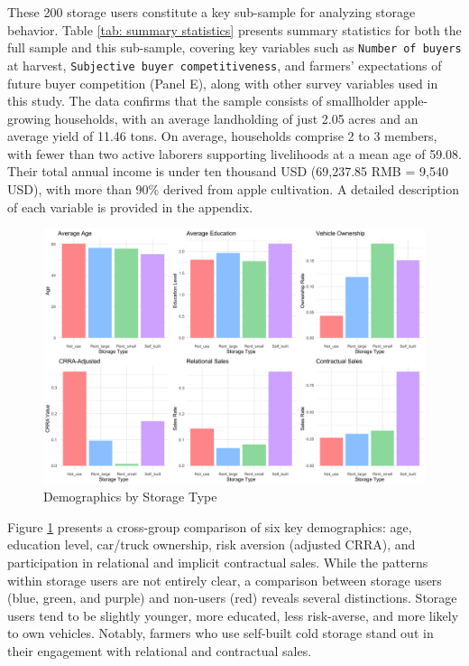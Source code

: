\documentclass[12pt]{article}
\begin{document}
These 200 storage users constitute a key sub-sample for analyzing storage behavior. Table \ref{tab: summary statistics} presents summary statistics for both the full sample and this sub-sample, covering key variables such as \texttt{Number of buyers} at harvest, \texttt{Subjective buyer competitiveness}, and farmers' expectations of future buyer competition (Panel E), along with other survey variables used in this study. The data confirms that the sample consists of smallholder apple-growing households, with an average landholding of just 2.05 acres and an average yield of 11.46 tons. On average, households comprise 2 to 3 members, with fewer than two active laborers supporting livelihoods at a mean age of 59.08. Their total annual income is under ten thousand USD (69,237.85 RMB = 9,540 USD), with more than 90\% derived from apple cultivation. A detailed description of each variable is provided in the appendix.

\begin{figure}[htp]
\centering
\includegraphics[width=1\textwidth]{figures/combined_storage_metrics.png}
\caption{Demographics by Storage Type}
\label{Figure: Demographics by Storage Type}
\end{figure}

Figure \ref{Figure: Demographics by Storage Type} presents a cross-group comparison of six key demographics: age, education level, car/truck ownership, risk aversion (adjusted CRRA), and participation in relational and implicit contractual sales. While the patterns within storage users are not entirely clear, a comparison between storage users (blue, green, and purple) and non-users (red) reveals several distinctions. Storage users tend to be slightly younger, more educated, less risk-averse, and more likely to own vehicles. Notably, farmers who use self-built cold storage stand out in their engagement with relational and contractual sales.
\end{document}
